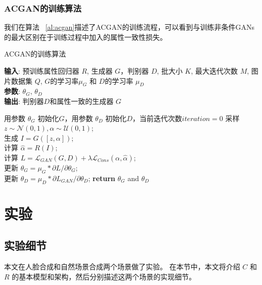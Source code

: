 \subsubsection{ACGAN的训练算法}
我们在算法 ~\ref{al:acgan}描述了ACGAN的训练流程，可以看到与训练非条件GANs的最大区别在于训练过程中加入的属性一致性损失。

\begin{algorithm}[H]
\caption{ACGAN的训练算法}
\label{al:acgan}
\textbf{输入}: 预训练属性回归器 $R$, 生成器 $G$，判别器 $D$, 批大小 $K$, 最大迭代次数 $M$, 图片数据集 $Q$, $G$的学习率$\mu_G$ 和 $D$的学习率 $\mu_D$\\
\textbf{参数}: $\theta_G$, $\theta_D$\\
\textbf{输出}: 判别器$D$和属性一致的生成器 $G$\\
\begin{algorithmic}[1] %
\STATE 用参数 $\theta_G$ 初始化$G$，用参数 $\theta_D$ 初始化$D$，当前迭代次数$iteration=0$
\STATE 采样 $z \sim \mathcal{N}(0,1), \alpha \sim \mathcal{U}(0,1)$;\\
    \STATE 生成 $I=G([z,\alpha])$;\\
    \STATE 计算 $\hat{\alpha} = R(I)$;\\
    \STATE 计算 $L=\mathcal{L}_{GAN}(G,D) +  \lambda \mathcal{L}_{Cons}(\alpha, \hat{\alpha})$;\\
    \STATE 更新 $\theta_G = \mu_G * \partial{L}/\partial{\theta_G}$;\\
    \STATE 更新 $\theta_D = \mu_D * \partial{L_{GAN}}/\partial{\theta_D}$;
\ENDWHILE
\STATE \textbf{return} $\theta_G$ and $\theta_D$
\end{algorithmic}
\end{algorithm}


\section{实验}

\subsection{实验细节}
本文在人脸合成和自然场景合成两个场景做了实验。 在本节中，本文将介绍 $C$ 和 $R$ 的基本模型和架构，然后分别描述这两个场景的实现细节。

